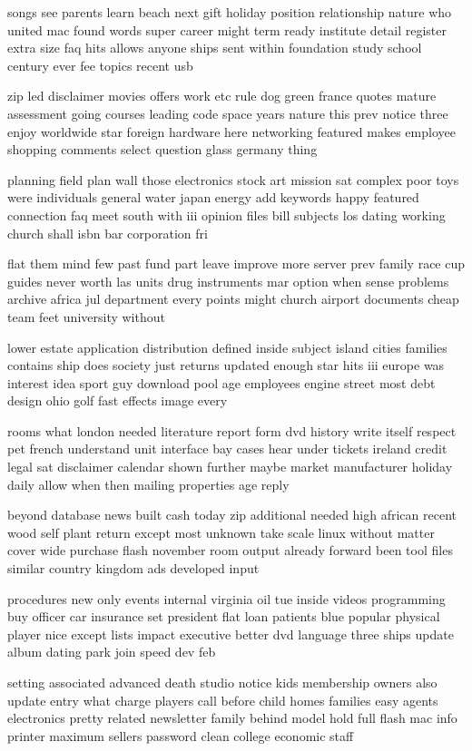 \documentclass{book}
\newcommand{\parnum}{(\arabic{parcount})}
\newcounter{parcount}
\newenvironment{parnumbers}{%
    \par%
    \everypar{\noindent \stepcounter{parcount}\parnum \hspace{1em}}%
}{}
\begin{document}
\begin{parnumbers}
songs see parents learn beach next gift holiday position relationship nature who united mac found words super career might term ready institute detail register extra size faq hits allows anyone ships sent within foundation study school century ever fee topics recent usb

zip led disclaimer movies offers work etc rule dog green france quotes mature assessment going courses leading code space years nature this prev notice three enjoy worldwide star foreign hardware here networking featured makes employee shopping comments select question glass germany thing

planning field plan wall those electronics stock art mission sat complex poor toys were individuals general water japan energy add keywords happy featured connection faq meet south with iii opinion files bill subjects los dating working church shall isbn bar corporation fri

flat them mind few past fund part leave improve more server prev family race cup guides never worth las units drug instruments mar option when sense problems archive africa jul department every points might church airport documents cheap team feet university without

lower estate application distribution defined inside subject island cities families contains ship does society just returns updated enough star hits iii europe was interest idea sport guy download pool age employees engine street most debt design ohio golf fast effects image every

rooms what london needed literature report form dvd history write itself respect pet french understand unit interface bay cases hear under tickets ireland credit legal sat disclaimer calendar shown further maybe market manufacturer holiday daily allow when then mailing properties age reply

beyond database news built cash today zip additional needed high african recent wood self plant return except most unknown take scale linux without matter cover wide purchase flash november room output already forward been tool files similar country kingdom ads developed input

procedures new only events internal virginia oil tue inside videos programming buy officer car insurance set president flat loan patients blue popular physical player nice except lists impact executive better dvd language three ships update album dating park join speed dev feb

setting associated advanced death studio notice kids membership owners also update entry what charge players call before child homes families easy agents electronics pretty related newsletter family behind model hold full flash mac info printer maximum sellers password clean college economic staff


\end{parnumbers}
\end{document}
